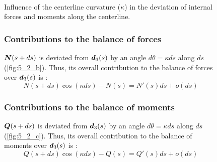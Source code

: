 

\begin{figure}[p]
  \begin{leftfullpage}
    \captionsetup[subfloat]{captionskip=10pt}
     	\centering
     	 \\
	\vspace{30pt}
	\vspace{30pt}
	\caption{Influence of the centerline curvature ($\kappa$) in the deviation of internal forces and moments along the centerline.}     
	\label{fig:5_2}
 \end{leftfullpage}
\end{figure}
\begin{figure}[p]
	\begin{fullpage}
	\subsubsection{Contributions to the balance of forces}
	\vspace{10pt}
	$\boldsymbol{N}(s+ds)$ is deviated from $\boldsymbol{d}_3(s)$ by an angle $d\theta = \kappa ds$ along $ds$ (\cref{fig:5_2_b}). Thus, its overall contribution to the balance of forces over $\boldsymbol{d}_3(s)$ is : 
	\begin{equation*}
		N(s+ds) \cos(\kappa ds) - N(s) = N'(s) ds + o(ds)
	\end{equation*}	
	\vspace{10pt}
	\subsubsection{Contributions to the balance of moments}
	\vspace{10pt}
	$\boldsymbol{Q}(s+ds)$ is deviated from $\boldsymbol{d}_3(s)$ by an angle $d\theta = \kappa ds$ along $ds$ (\cref{fig:5_2_c}). Thus, its overall contribution to the balance of moments over $\boldsymbol{d}_3(s)$ is : 
	\begin{equation*}
		Q(s+ds) \cos(\kappa ds) - Q(s) = Q'(s) ds + o(ds)
	\end{equation*}	
	  \end{fullpage}
\end{figure}

